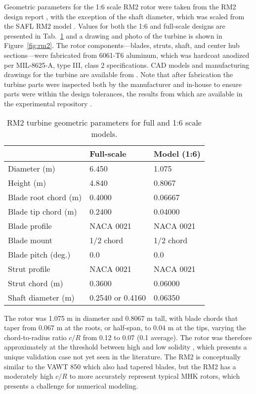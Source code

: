 Geometric parameters for the 1:6 scale RM2 rotor were taken from the RM2 design
report \cite{Barone2011}, with the exception of the shaft diameter, which was
scaled from the SAFL RM2 model \cite{Hill2014}. Values for both the 1:6 and
full-scale designs are presented in Tab.~\ref{tab:rm2-geom} and a drawing and
photo of the turbine is shown in Figure~\ref{fig:rm2}. The rotor
components---blades, struts, shaft, and center hub sections---were fabricated
from 6061-T6 aluminum, which was hardcoat anodized per MIL-8625-A, type III,
class 2 specifications. CAD models and manufacturing drawings for the turbine
are available from \cite{Bachant2015-RM2-CAD}. Note that after fabrication the
turbine parts were inspected both by the manufacturer and in-house to ensure
parts were within the design tolerances, the results from which are available in
the experimental repository \cite{Bachant2016-RM2-data}.

\begin{table}
    \centering
    \begin{tabular}{l|l|l}
        & Full-scale & Model (1:6) \\
        \hline
        Diameter (m)   & 6.450 & 1.075 \\
        Height (m)     & 4.840 & 0.8067 \\
        Blade root chord (m) & 0.4000 & 0.06667 \\
        Blade tip chord (m)  & 0.2400 & 0.04000 \\
        Blade profile & NACA 0021 & NACA 0021 \\
        Blade mount & 1/2 chord & 1/2 chord \\
        Blade pitch (deg.) & 0.0 & 0.0 \\
        Strut profile & NACA 0021 & NACA 0021 \\
        Strut chord (m) & 0.3600 & 0.06000 \\
        Shaft diameter (m) & 0.2540 \cite{Beam2011} or 0.4160 \cite{Hill2014} & 0.06350\\
    \end{tabular}
    \caption{RM2 turbine geometric parameters for full and 1:6 scale models.}
    \label{tab:rm2-geom}
\end{table}

The rotor was 1.075 m in diameter and 0.8067 m tall, with blade chords that
taper from 0.067 m at the roots, or half-span, to 0.04 m at the tips, varying
the chord-to-radius ratio $c/R$ from 0.12 to 0.07 (0.1 average). The rotor was
therefore approximately at the threshold between high and low solidity
\cite{Strickland1981,Fiedler2009}, which presents a unique validation case not
yet seen in the literature. The RM2 is conceptually similar to the VAWT 850
\cite{Mays1990} which also had tapered blades, but the RM2 has a moderately high
$c/R$ to more accurately represent typical MHK rotors, which presents a
challenge for numerical modeling.

